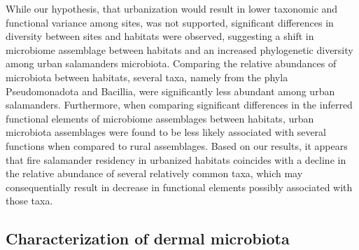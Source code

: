 \documentclass[
  12pt,
]{article}
\begin{document}
While our hypothesis, that urbanization would result in lower taxonomic
and functional variance among sites, was not supported, significant
differences in diversity between sites and habitats were observed,
suggesting a shift in microbiome assemblage between habitats and an
increased phylogenetic diversity among urban salamanders microbiota.
Comparing the relative abundances of microbiota between habitats,
several taxa, namely from the phyla Pseudomonadota and Bacillia, were
significantly less abundant among urban salamanders. Furthermore, when
comparing significant differences in the inferred functional elements of
microbiome assemblages between habitats, urban microbiota assemblages
were found to be less likely associated with several functions when
compared to rural assemblages. Based on our results, it appears that
fire salamander residency in urbanized habitats coincides with a decline
in the relative abundance of several relatively common taxa, which may
consequentially result in decrease in functional elements possibly
associated with those taxa.

\subsection{Characterization of dermal
microbiota}\label{characterization-of-dermal-microbiota}
\end{document}
